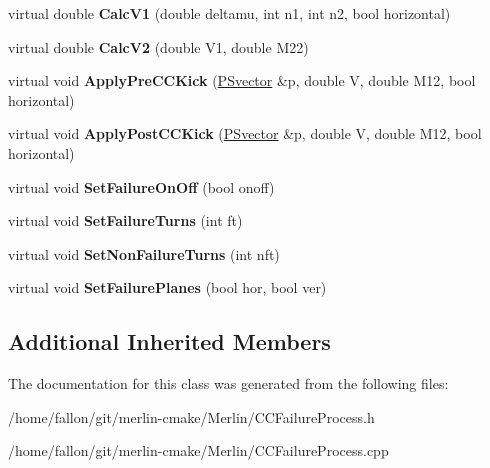 \begin{DoxyCompactItemize}
virtual double {\bfseries Calc\+V1} (double deltamu, int n1, int n2, bool horizontal)
\item 
\mbox{\label{classParticleTracking_1_1CCFailureProcess_a5f3f22a7613e9ec6c6e0bbe92753027b}} 
virtual double {\bfseries Calc\+V2} (double V1, double M22)
\item 
\mbox{\label{classParticleTracking_1_1CCFailureProcess_ac0f155202d76cc1c521b3126def5e1a0}} 
virtual void {\bfseries Apply\+Pre\+C\+C\+Kick} (\hyperlink{classPSvector}{P\+Svector} \&p, double V, double M12, bool horizontal)
\item 
\mbox{\label{classParticleTracking_1_1CCFailureProcess_a40f00d034e33703c0825428b974ff585}} 
virtual void {\bfseries Apply\+Post\+C\+C\+Kick} (\hyperlink{classPSvector}{P\+Svector} \&p, double V, double M12, bool horizontal)
\item 
\mbox{\label{classParticleTracking_1_1CCFailureProcess_a5fc3da714963b381a84e8fad8ad301b8}} 
virtual void {\bfseries Set\+Failure\+On\+Off} (bool onoff)
\item 
\mbox{\label{classParticleTracking_1_1CCFailureProcess_abb6bbf06ce70c224d428f32282d3dc4a}} 
virtual void {\bfseries Set\+Failure\+Turns} (int ft)
\item 
\mbox{\label{classParticleTracking_1_1CCFailureProcess_af537977e29d771616b53f85d3d20b712}} 
virtual void {\bfseries Set\+Non\+Failure\+Turns} (int nft)
\item 
\mbox{\label{classParticleTracking_1_1CCFailureProcess_ab816440403837c79221b8a71049ce982}} 
virtual void {\bfseries Set\+Failure\+Planes} (bool hor, bool ver)
\end{DoxyCompactItemize}
\subsection*{Additional Inherited Members}


The documentation for this class was generated from the following files\+:\begin{DoxyCompactItemize}
\item 
/home/fallon/git/merlin-\/cmake/\+Merlin/C\+C\+Failure\+Process.\+h\item 
/home/fallon/git/merlin-\/cmake/\+Merlin/C\+C\+Failure\+Process.\+cpp\end{DoxyCompactItemize}

